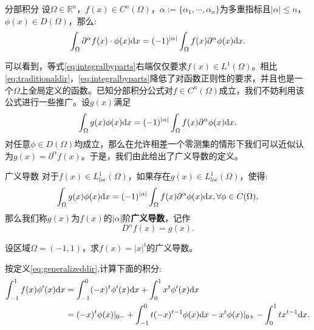 \begin{proposition}{分部积分}
    设$\Omega\in\mathbb{R}^{n}$，$f(x)\in C^{n}(\Omega)$，$\alpha:=\{\alpha_{1},\cdots,\alpha_{n}\}$为多重指标且$|\alpha|\le n$，$\phi(x)\in D(\Omega)$，那么:
    \begin{equation}
        \label{eq:integralbyparts}
        \int_{\Omega}\partial^{\alpha}f(x)\cdot\phi(x)\mathrm{d} x=(-1)^{|\alpha|}\int_{\Omega}f(x)\partial^{\alpha}\phi(x)\mathrm{d} x.
    \end{equation}
\end{proposition}
可以看到，等式\eqref{eq:integralbyparts}右端仅仅要求$f(x)\in L^{1}(\Omega)$。相比\eqref{eq:traditionaldir}，\eqref{eq:integralbyparts}降低了对函数正则性的要求，并且也是一个$\Omega$上全局定义的函数。已知分部积分公式对$f\in C^{n}(\Omega)$成立，我们不妨利用该公式进行一些推广。设$g(x)$满足
\begin{equation}
    \label{eq:generalizeddir}
    \int_{\Omega}g(x)\phi(x)\mathrm{d} x=(-1)^{|\alpha|}\int_{\Omega}f(x)\partial^{\alpha}\phi(x)\mathrm{d} x.
\end{equation}
对任意$\phi\in D(\Omega)$均成立，那么在允许相差一个零测集的情形下我们可以近似认为$g(x)=\partial^{\alpha}f(x)$。于是，我们由此给出了广义导数的定义。
\begin{definition}{广义导数}
    对于$f(x)\in L_{loc}^{1}(\Omega)$，如果存在$g(x)\in L_{loc}^{1}(\Omega)$，使得:
    \begin{equation}
        \int_{\Omega}g(x)\phi(x)\mathrm{d} x=(-1)^{|\alpha|}\int_{\Omega}f(x)\partial^{\alpha}\phi(x)\mathrm{d} x,\forall\phi\in C(\Omega),
    \end{equation}
    那么我们称$g(x)$为$f(x)$的$|\alpha|$阶\textbf{广义导数}，记作
    \begin{equation}
        \label{eq:generaldirmark}
        D^{\alpha}f(x)=g(x).
    \end{equation}
\end{definition}
\begin{example}
    设区域$\Omega=(-1,1)$，求$f(x)=|x|^{t}$的广义导数。
\end{example}
按定义\eqref{eq:generalizeddir},计算下面的积分:
\begin{equation}
    \label{eq:ex1}
    \begin{aligned}
    \int_{-1}^{1}f(x)\phi'(x)\mathrm{d} x&=\int_{-1}^{0}(-x)^{t}\phi'(x)\mathrm{d} x+\int_{0}^{1}x^{t}\phi'(x)\mathrm{d} x\\
    &=(-x)^{t}\phi(x)|_{0-}+\int_{-1}^{0}t(-x)^{t-1}\phi(x)\mathrm{d} x-x^{t}\phi(x)|_{0+}-\int_{0}^{1}tx^{t-1}\mathrm{d} x.
    \end{aligned}
\end{equation}
